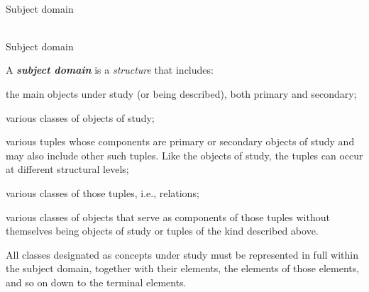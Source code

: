 \begin{frame}{\\Subject domain}
	\topline
	\justifying
	\begin{SCn}
	\end{SCn}
\end{frame}

\begin{frame}{\\Subject domain}
	\topline
	\justifying
	\\
	\footnotesize{
		A \textbf{\textit{subject domain}} is a \textit{structure} that includes:
		\begin{textitemize}
			\item{\textnormal{the main objects under study (or being described), both primary and secondary;}}
			\item{\textnormal{various classes of objects of study;}}
			\item{\textnormal{various tuples whose components are primary or secondary objects of study and may also include other such tuples. Like the objects of study, the tuples can occur at different structural levels;}}
			\item{\textnormal{various classes of those tuples, i.e., relations;}}
			\item{\textnormal{various classes of objects that serve as components of those tuples without themselves being objects of study or tuples of the kind described above.}}
		\end{textitemize}
		All classes designated as concepts under study must be represented in full within the subject domain, together with their elements, the elements of those elements, and so on down to the terminal elements.
	}
\end{frame}

